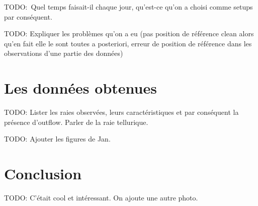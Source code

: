 \documentclass[a4paper,10pt,french]{article}
\begin{document}
TODO: Quel temps faisait-il chaque jour, qu’est-ce qu’on a choisi comme setups
par conséquent.

TODO: Expliquer les problèmes qu’on a eu (pas position de référence clean alors
qu’en fait elle le sont toutes a posteriori, erreur de position de référence
dans les observations d’une partie des données)

\section{Les données obtenues}

TODO: Lister les raies observées, leurs caractéristiques et par conséquent la
présence d’outflow. Parler de la raie tellurique.

TODO: Ajouter les figures de Jan.

\section*{Conclusion}

TODO: C’était cool et intéressant. On ajoute une autre photo.
\end{document}
